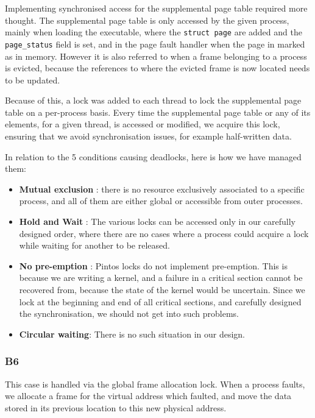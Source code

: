 \documentclass[a4wide, 11pt]{article}
\newcommand{\tx}{\texttt}
\begin{document}
Implementing synchronised access for the supplemental page table required more thought. The supplemental page table is only accessed by the given process, mainly when loading the executable, where the \tx{struct page} are added and the \tx{page\_status} field is set, and in the page fault handler when the page in marked as in memory. However it is also referred to when a frame belonging to a process is evicted, because the references to where the evicted frame is now located needs to be updated.

Because of this, a lock was added to each thread to lock the supplemental page table on a per-process basis. Every time the supplemental page table or any of its elements, for a given thread, is accessed or modified, we acquire this lock, ensuring that we avoid synchronisation issues, for example half-written data.

In relation to the 5 conditions causing deadlocks, here is how we have managed them:
\begin{itemize}
\item \textbf{Mutual exclusion} : there is no resource exclusively associated to a specific process, and all of them are either global or accessible from outer processes.
\item \textbf{Hold and Wait} : The various locks can be accessed only in our carefully designed order, where there are no cases where a process could acquire a lock while waiting for another to be released.
\item \textbf{No pre-emption} : Pintos locks do not implement pre-emption. This is because we are writing a kernel, and a failure in a critical section cannot be recovered from, because the state of the kernel would be uncertain. Since we lock at the beginning and end of all critical sections, and carefully designed the synchronisation, we should not get into such problems.
\item \textbf{Circular waiting}: There is no such situation in our design.
\end{itemize}

\subsubsection{B6}

This case is handled via the global frame allocation lock. When a process faults, we allocate a frame for the virtual address which faulted, and move the data stored in its previous location to this new physical address.
\end{document}
